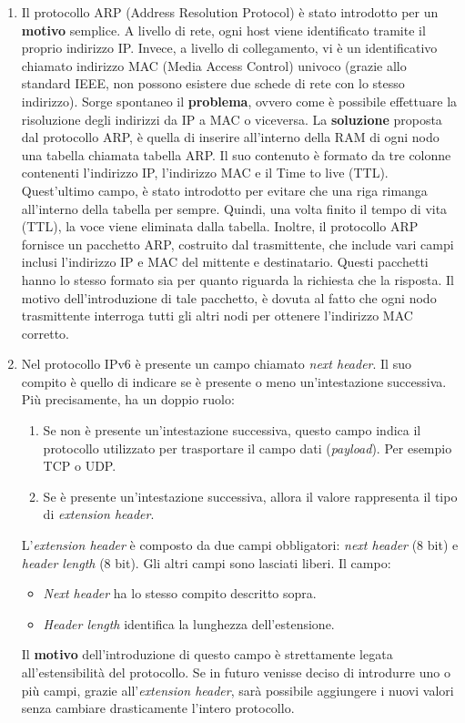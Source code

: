 \documentclass[a4paper]{article}
\begin{document}
	\begin{enumerate}
		\item Il protocollo ARP (Address Resolution Protocol) è stato introdotto per un \textbf{motivo} semplice. A livello di rete, ogni host viene identificato tramite il proprio indirizzo IP. Invece, a livello di collegamento, vi è un identificativo chiamato indirizzo MAC (Media Access Control) univoco (grazie allo standard IEEE, non possono esistere due schede di rete con lo stesso indirizzo). Sorge spontaneo il \textbf{problema}, ovvero come è possibile effettuare la risoluzione degli indirizzi da IP a MAC o viceversa.\newline
		La \textbf{soluzione} proposta dal protocollo ARP, è quella di inserire all'interno della RAM di ogni nodo una tabella chiamata tabella ARP. Il suo contenuto è formato da tre colonne contenenti l'indirizzo IP, l'indirizzo MAC e il Time to live (TTL). Quest'ultimo campo, è stato introdotto per evitare che una riga rimanga all'interno della tabella per sempre. Quindi, una volta finito il tempo di vita (TTL), la voce viene eliminata dalla tabella.\newline
		Inoltre, il protocollo ARP fornisce un pacchetto ARP, costruito dal trasmittente, che include vari campi inclusi l'indirizzo IP e MAC del mittente e destinatario. Questi pacchetti hanno lo stesso formato sia per quanto riguarda la richiesta che la risposta. Il motivo dell'introduzione di tale pacchetto, è dovuta al fatto che ogni nodo trasmittente interroga tutti gli altri nodi per ottenere l'indirizzo MAC corretto.\label{ARP}\newpage
		
		\item Nel protocollo IPv6 è presente un campo chiamato \emph{next header}. Il suo compito è quello di indicare se è presente o meno un'intestazione successiva. Più precisamente, ha un doppio ruolo:
		\begin{enumerate}
			\item Se non è presente un'intestazione successiva, questo campo indica il protocollo utilizzato per trasportare il campo dati (\emph{payload}). Per esempio TCP o UDP.
			
			\item Se è presente un'intestazione successiva, allora il valore rappresenta il tipo di \emph{extension header}.
		\end{enumerate}
		L'\emph{extension header} è composto da due campi obbligatori: \emph{next header} (8 bit) e \emph{header length} (8 bit). Gli altri campi sono lasciati liberi. Il campo:
		\begin{itemize}
			\item \emph{Next header} ha lo stesso compito descritto sopra.
			\item \emph{Header length} identifica la lunghezza dell'estensione.
		\end{itemize}
		Il \textbf{motivo} dell'introduzione di questo campo è strettamente legata all'estensibilità del protocollo. Se in futuro venisse deciso di introdurre uno o più campi, grazie all'\emph{extension header}, sarà possibile aggiungere i nuovi valori senza cambiare drasticamente l'intero protocollo.
		

\end{enumerate}
\end{document}
